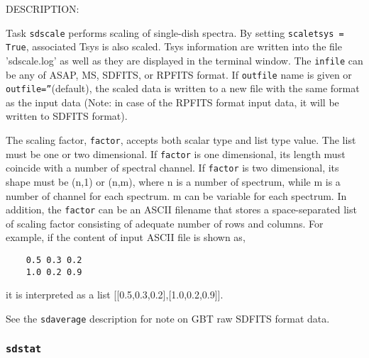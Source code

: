 DESCRIPTION:

Task {\tt sdscale} performs scaling of single-dish spectra.
By setting {\tt scaletsys = True}, associated Tsys is also scaled.
Tsys information are written into the file 'sdscale.log'
as well as they are displayed in the terminal window.
The {\tt infile} can be any of ASAP, MS, SDFITS, or RPFITS format.
If {\tt outfile} name is given or {\tt outfile=''}(default), the scaled data is written
to a new file with the same format as the input data (Note: in case of the
RPFITS format input data, it will be written to SDFITS format).
    
The scaling factor, {\tt factor}, accepts both scalar type and list type
value. The list must be one or two dimensional. If {\tt factor} is one
dimensional, its length must coincide with a number of spectral
channel. If {\tt factor} is two dimensional, its shape must be (n,1) or
(n,m), where n is a number of spectrum, while m is a number of channel
for each spectrum. m can be variable for each spectrum. In addition,
the {\tt factor} can be an ASCII filename that stores a space-separated list
of scaling factor consisting of adequate number of rows and columns.
For example, if the content of input ASCII file is shown as,

\begin{verbatim}
    0.5 0.3 0.2
    1.0 0.2 0.9
\end{verbatim}

it is interpreted as a list [[0.5,0.3,0.2],[1.0,0.2,0.9]].

See the {\tt sdaverage} description for note on GBT raw SDFITS format data.

\subsubsection{{\tt sdstat}}
\label{section:sd.sdtasks.tasks.sdstat}


